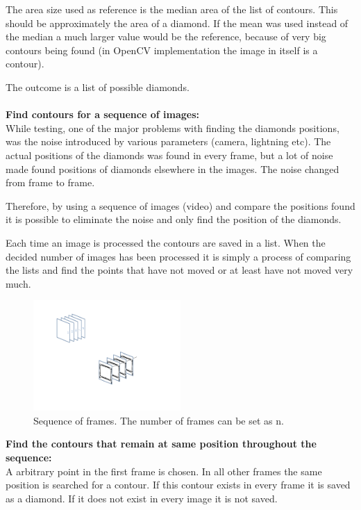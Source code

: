 The area size used as reference is the median area of the list of contours. This should be approximately the area of a diamond. If the mean was used instead of the median a much larger value would be the reference, because of very big contours being found (in OpenCV implementation the image in itself is a contour).

The outcome is a list of possible diamonds.\\\\

\textbf{Find contours for a sequence of images:}\\
While testing, one of the major problems with finding the diamonds positions, was the noise introduced by various parameters (camera, lightning etc). The actual positions of the diamonds was found in every frame, but a lot of noise made found positions of diamonds elsewhere in the images. 
The noise changed from frame to frame.

Therefore, by using a sequence of images (video) and compare the positions found it is possible to eliminate the noise and only find the position of the diamonds.

Each time an image is processed the contours are saved in a list. When the decided number of images has been processed it is simply a process of comparing the lists and find the points that have not moved or at least have not moved very much.\\

\begin{figure}[H]
\begin{center}
\leavevmode
\includegraphics[width=0.5\textwidth]{images/image_seq_numbers.pdf}
\end{center}
\caption{Sequence of frames. The number of frames can be set as n.}
\label{fig:seq_img}
\end{figure}

\textbf{Find the contours that remain at same position throughout the sequence:}\\
A arbitrary point in the first frame is chosen. In all other frames the same position is searched for a contour. If this contour exists in every frame it is saved as a diamond. If it does not exist in every image it is not saved.

